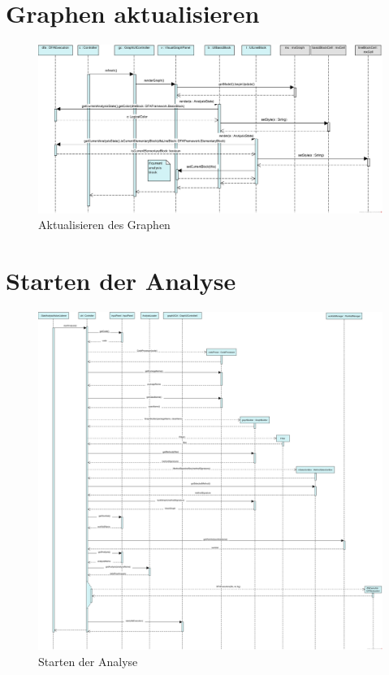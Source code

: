 \section*{Graphen aktualisieren}
\begin{figure}[H]
	\centering
	\includegraphics[width=1\textwidth]{Sequenzdiagramme/RefreshGraph}
	\caption{Aktualisieren des Graphen}
	\label{fig:graphrefresh}
\end{figure}
\newpage

\section*{Starten der Analyse}
\begin{figure}[H]
  \centering
    \includegraphics[width=1\textwidth]{Sequenzdiagramme/AnalysisStart}
  \caption{Starten der Analyse}
  \label{fig:anaStart}
\end{figure}
\newpage

